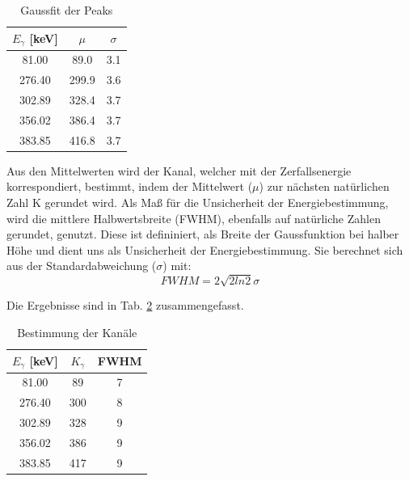 \begin{table}[h]
\centering
\begin{tabular}{|c | c |c |}
\hline
$E_{\gamma}$ [\si{\kilo\electronvolt}]  & $\mu$ & $\sigma$ \\
\hline
81.00 & 89.0 & 3.1 \\
276.40 & 299.9 & 3.6 \\
302.89 & 328.4 & 3.7 \\
356.02 & 386.4 & 3.7 \\
383.85 & 416.8 & 3.7 \\
\hline
\end{tabular}
\caption{Gaussfit der Peaks}
\label{peaks}
\end{table}

Aus den Mittelwerten wird der Kanal, welcher mit der Zerfallsenergie korrespondiert, bestimmt, indem der Mittelwert ($\mu$) zur nächsten natürlichen Zahl K gerundet wird.
Als Maß für die Unsicherheit der Energiebestimmung, wird die mittlere Halbwertsbreite (FWHM), ebenfalls auf natürliche Zahlen gerundet, genutzt.
Diese ist defininiert, als Breite der Gaussfunktion bei halber Höhe und dient uns als Unsicherheit der Energiebestimmung.
Sie berechnet sich aus der Standardabweichung ($\sigma$) mit:
\begin{equation}
FWHM = 2 \sqrt{2 ln2} \sigma
\end{equation}

Die Ergebnisse sind in Tab. \ref{kanal} zusammengefasst.

\begin{table}[h]
\centering
\begin{tabular}{|c | c |c |}
\hline
$E_{\gamma}$ [\si{\kilo\electronvolt}]  & $K_{\gamma}$ & FWHM \\
\hline
81.00 & 89 & 7 \\
276.40 & 300 & 8 \\
302.89 & 328 & 9 \\
356.02 & 386 & 9 \\
383.85 & 417 & 9 \\
\hline
\end{tabular}
\caption{Bestimmung der Kanäle}
\label{kanal}
\end{table}

